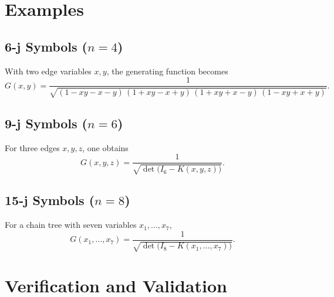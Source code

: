 \documentclass[11pt]{article}
\begin{document}
\section{Examples}
\subsection{6-j Symbols ($n=4$)}
With two edge variables $x,y$, the generating function becomes
\begin{equation}\label{eq:6j}
  \boxed{
  G(x,y)
  = \frac{1}{\sqrt{(1 - x y - x - y)\,(1 + x y - x + y)\,(1 + x y + x - y)\,(1 - x y + x + y)}}.
  }
\end{equation}

\subsection{9-j Symbols ($n=6$)}
For three edges $x,y,z$, one obtains
\begin{equation}\label{eq:9j}
  \boxed{
  G(x,y,z)
  = \frac{1}{\sqrt{\det\!\bigl(I_6 - K(x,y,z)\bigr)}}.
  }
\end{equation}

\subsection{15-j Symbols ($n=8$)}
For a chain tree with seven variables $x_1,\dots,x_7$,
\begin{equation}\label{eq:15j}
  \boxed{
  G(x_1,\dots,x_7)
  = \frac{1}{\sqrt{\det\!\bigl(I_8 - K(x_1,\dots,x_7)\bigr)}}.
  }
\end{equation}

\section{Verification and Validation}
\end{document}
